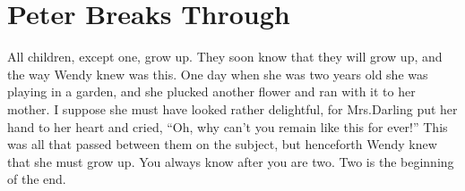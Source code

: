 
\chapter{Peter Breaks Through}

All children, except one, grow up.
They soon know that they will grow up,
and the way Wendy knew was this.
One day when she was two years old she was playing in a garden,
and she plucked another flower and ran with it to her mother.
I suppose she must have looked rather delightful,
for Mrs.\@ Darling put her hand to her heart and cried,
“Oh, why can't you remain like this for ever!”
This was all that passed between them on the subject,
but henceforth Wendy knew that she must grow up.
You always know after you are two.
Two is the beginning of the end.

\endinput

